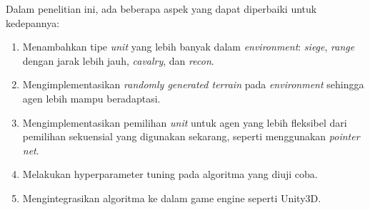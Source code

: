Dalam penelitian ini, ada beberapa aspek yang dapat diperbaiki untuk kedepannya:

\begin{enumerate}[nolistsep]

  \item Menambahkan tipe \emph{unit} yang lebih banyak dalam \emph{environment}: \emph{siege}, \emph{range}
  dengan jarak lebih jauh, \emph{cavalry}, dan \emph{recon}.

  \item Mengimplementasikan \emph{randomly generated terrain} pada \emph{environment} sehingga agen lebih
  mampu beradaptasi.

  \item Mengimplementasikan pemilihan \emph{unit} untuk agen yang lebih fleksibel dari pemilihan sekuensial
  yang digunakan sekarang, seperti menggunakan \emph{pointer net}.

  \item Melakukan hyperparameter tuning pada algoritma yang diuji coba.
  
  \item Mengintegrasikan algoritma ke dalam game engine seperti Unity3D.

\end{enumerate}
